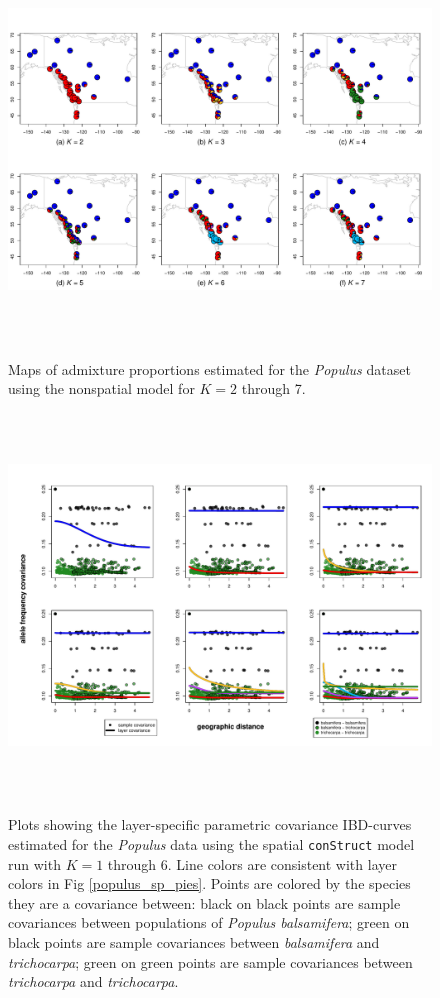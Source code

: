 \documentclass[12pt]{article}
\newcommand{\tri}{\textit{trichocarpa}}
\newcommand{\bals}{\textit{balsamifera}}
\begin{document}
\begin{figure}
	\centering
		{\includegraphics[width=6in,height=4in]{figs/populus/populus_nsp_pies.pdf}}
	\caption{
	Maps of admixture proportions estimated for the \textit{Populus} dataset 
	using the nonspatial model for $K=2$ through 7.
    }\label{populus_nsp_pies}
\end{figure}

\begin{figure}
	\centering
		{\includegraphics[width=6in,height=4in]{figs/populus/populus_sp_layer_covs.pdf}}
	\caption{
	Plots showing the layer-specific parametric covariance IBD-curves 
	estimated for the \textit{Populus} data using 
	the spatial \texttt{conStruct} model run with $K=1$ through 6.
	Line colors are consistent with layer colors in Fig \ref{populus_sp_pies}.
	Points are colored by the species they are a covariance between:
	black on black points are sample covariances between populations of \textit{Populus balsamifera};
	green on black points are sample covariances between \bals{} and \tri{};
	green on green points are sample covariances between \tri{} and \tri{}.
    }\label{populus_sp_layer_covs}
\end{figure}
\end{document}
